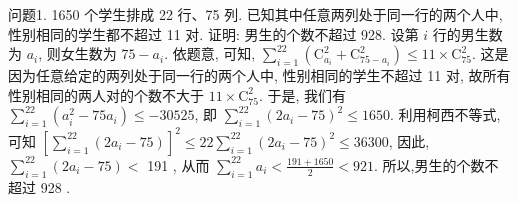 
问题1. 1650 个学生排成 22 行、75 列.
已知其中任意两列处于同一行的两个人中, 性别相同的学生都不超过 11 对.
证明: 男生的个数不超过 928.
设第 $i$ 行的男生数为 $a_i$, 则女生数为 $75-a_i$. 依题意, 可知, $\sum_{i=1}^{22}\left(\mathrm{C}_{a_i}^2+\right. \left.\mathrm{C}_{75-a_i}^2\right) \leqslant 11 \times \mathrm{C}_{75}^2$. 这是因为任意给定的两列处于同一行的两个人中, 性别相同的学生不超过 11 对, 故所有性别相同的两人对的个数不大于 $11 \times \mathrm{C}_{75}^2$. 于是, 我们有 $\sum_{i=1}^{22}\left(a_i^2-75 a_i\right) \leqslant-30525$, 即 $\sum_{i=1}^{22}\left(2 a_i-75\right)^2 \leqslant 1650$. 利用柯西不等式, 可知 $\left[\sum_{i=1}^{22}\left(2 a_i-75\right)\right]^2 \leqslant 22 \sum_{i=1}^{22}\left(2 a_i-75\right)^2 \leqslant 36300$, 因此, $\sum_{i=1}^{22}\left(2 a_i-75\right)<$ 191 , 从而 $\sum_{i=1}^{22} a_i<\frac{191+1650}{2}<921$. 所以,男生的个数不超过 928 .



